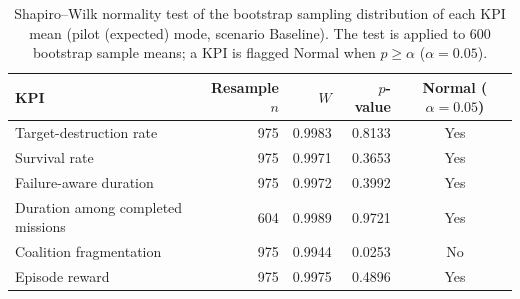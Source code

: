 \begin{table}[htbp]
  \centering
  \caption{Shapiro--Wilk normality test of the bootstrap sampling distribution of each KPI mean (pilot (expected) mode, scenario Baseline). The test is applied to 600 bootstrap sample means; a KPI is flagged Normal when $p \geq \alpha$ ($\alpha=0.05$).}
  \label{tab:normality_Baseline_pilot}
  \begin{tabular}{lrrrc}
    \toprule
    KPI & Resample $n$ & $W$ & $p$-value & Normal ($\alpha=0.05$) \\
    \midrule
    Target-destruction rate & 975 & 0.9983 & 0.8133 & Yes \\
    Survival rate & 975 & 0.9971 & 0.3653 & Yes \\
    Failure-aware duration & 975 & 0.9972 & 0.3992 & Yes \\
    Duration among completed missions & 604 & 0.9989 & 0.9721 & Yes \\
    Coalition fragmentation & 975 & 0.9944 & 0.0253 & No \\
    Episode reward & 975 & 0.9975 & 0.4896 & Yes \\
    \bottomrule
  \end{tabular}
\end{table}
